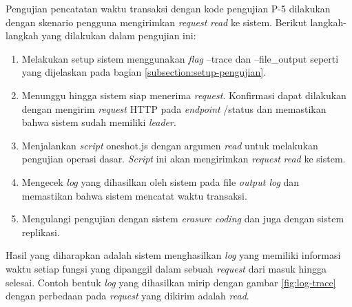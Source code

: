 Pengujian pencatatan waktu transaksi dengan kode pengujian P-5 dilakukan dengan skenario pengguna mengirimkan \textit{request} \textit{read} ke sistem. Berikut langkah-langkah yang dilakukan dalam pengujian ini:

\begin{enumerate}
  \item Melakukan setup sistem menggunakan \textit{flag} --trace dan --file\_output seperti yang dijelaskan pada bagian \ref{subsection:setup-pengujian}.
  \item Menunggu hingga sistem siap menerima \textit{request}. Konfirmasi dapat dilakukan dengan mengirim \textit{request} HTTP pada \textit{endpoint} /status dan memastikan bahwa sistem sudah memiliki \textit{leader}.
  \item Menjalankan \textit{script} oneshot.js dengan argumen \textit{read} untuk melakukan pengujian operasi dasar. \textit{Script} ini akan mengirimkan \textit{request} \textit{read} ke sistem.
  \item Mengecek \textit{log} yang dihasilkan oleh sistem pada file \textit{output log} dan memastikan bahwa sistem mencatat waktu transaksi.
  \item Mengulangi pengujian dengan sistem \textit{erasure coding} dan juga dengan sistem replikasi.
\end{enumerate}

Hasil yang diharapkan adalah sistem menghasilkan \textit{log} yang memiliki informasi waktu setiap fungsi yang dipanggil dalam sebuah \textit{request} dari masuk hingga selesai. Contoh bentuk \textit{log} yang dihasilkan mirip dengan gambar \ref{fig:log-trace} dengan perbedaan pada \textit{request} yang dikirim adalah \textit{read}.
